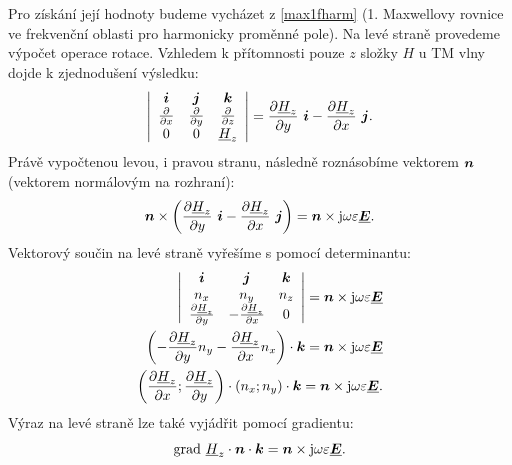 \documentclass[12pt,a4paper,oneside]{article}
\numberwithin{equation}{section} %
\numberwithin{figure}{section} %
\numberwithin{table}{section} %
\newcommand{\mj}{\mathrm{j}} %
\renewcommand{\vec}[1]{\mbox{\boldmath$#1$}} %
\newcommand{\faz}[1]{{\underline{#1}}} %
\newcommand{\grad}{\mathrm{grad}\ }
\begin{document}
Pro získání její hodnoty budeme vycházet z \ref{max1fharm} (1. Maxwellovy rovnice ve frekvenční oblasti pro harmonicky proměnné pole). Na levé straně provedeme výpočet operace rotace. Vzhledem k přítomnosti pouze $z$ složky $H$ u TM vlny dojde k zjednodušení výsledku:
\begin{equation}
\left| 
\begin{array}{c c c}
\vec{i} & \vec{j} & \vec{k} \\ 
\frac{\partial}{\partial x} & \frac{\partial}{\partial y} & \frac{\partial}{\partial z} \\
0 & 0 & \faz{H}_z
\end{array}
\right|
= \frac{\partial \faz{H}_z}{\partial y} ~ \vec{i} - \frac{\partial \faz{H}_z}{\partial x} ~ \vec{j}  .
\end{equation} 
Právě vypočtenou levou, i pravou stranu, následně roznásobíme vektorem $\vec{n}$ (vektorem normálovým na rozhraní):
\begin{equation}
\vec{n} \times \left( \frac{\partial \faz{H}_z}{\partial y} ~ \vec{i} - \frac{\partial \faz{H}_z}{\partial x} ~ \vec{j} \right) = \vec{n} \times \mj \omega \varepsilon \faz{\vec{E}} .
\end{equation}
Vektorový součin na levé straně vyřešíme s pomocí determinantu:
\begin{subequations}
\begin{align}
\left| 
\begin{array}{c c c}
\vec{i} & \vec{j} & \vec{k} \\ 
n_x & n_y & n_z \\
\frac{\partial \faz{H}_z}{\partial y} & - \frac{\partial \faz{H}_z}{\partial x} & 0
\end{array}
\right|
= \vec{n} \times \mj \omega \varepsilon \faz{\vec{E}} 
\\
\left( - \frac{\partial \faz{H}_z}{\partial y} n_y - \frac{\partial \faz{H}_z}{\partial x} n_x \right) \cdot \vec{k} = \vec{n} \times \mj \omega \varepsilon \faz{\vec{E}}
\\
\left( \frac{\partial \faz{H}_z}{\partial x} ; \frac{\partial \faz{H}_z}{\partial y} \right) \cdot \left( n_x; n_y \right) \cdot \vec{k} = \vec{n} \times \mj \omega \varepsilon \faz{\vec{E}} .
\end{align}
\end{subequations}
Výraz na levé straně lze také vyjádřit pomocí gradientu:
\begin{equation}
\grad \faz{H}_z \cdot \vec{n} \cdot \vec{k} = \vec{n} \times \mj \omega \varepsilon \faz{\vec{E}} .
\end{equation}
\end{document}

